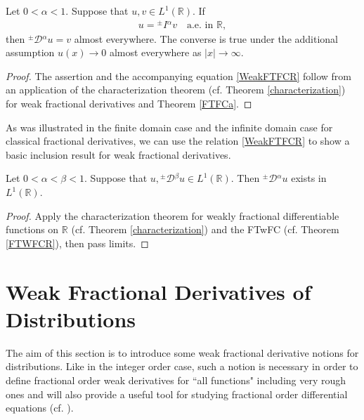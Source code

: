 \documentclass[leqno,final]{siamltex}
\numberwithin{equation}{section}
\renewcommand{\(}{\bigl(}
\renewcommand{\)}{\bigr)}
\newcommand{\R}{\mathbb{R}}
\begin{document}
\begin{theorem}\label{FTWFCR}
    Let $0 < \alpha < 1$. Suppose that $u, v \in L^{1}(\R)$. If
    \begin{align}\label{WeakFTFCR}
        u = {^{\pm}}{I}{^{\alpha}} v \quad \mbox{a.e. in } \R,
    \end{align}
    then ${^{\pm}}{\mathcal{D}}{^{\alpha}}u = v$ almost everywhere. The converse is true under the additional assumption $u(x) \rightarrow 0$ almost everywhere as $|x| \to \infty$.
\end{theorem}

\begin{proof}
    The assertion and the accompanying equation \eqref{WeakFTFCR} follow from
    an application of the characterization theorem (cf. Theorem \ref{characterization})
    for weak fractional derivatives and Theorem \ref{FTFCa}.
\end{proof}

As was illustrated in the finite domain case and the infinite domain case for classical fractional derivatives, we can use the relation \eqref{WeakFTFCR}
 to show a basic inclusion result for weak fractional derivatives.

\begin{proposition}
    Let $0 < \alpha < \beta < 1$. Suppose that $u, {^{\pm}}{\mathcal{D}}{^{\beta}} u \in L^{1}(\R)$. Then ${^{\pm}}{\mathcal{D}}{^{\alpha}}u$ exists in $L^{1}(\R)$. 
\end{proposition}

\begin{proof}
    Apply the characterization theorem for weakly fractional differentiable functions on $\R$ (cf. Theorem \ref{characterization}) and the FTwFC (cf. Theorem \ref{FTWFCR}), then pass limits.
\end{proof}



\section{Weak Fractional Derivatives of Distributions} \label{sec-6}
The aim of this section is to introduce some weak fractional derivative notions for distributions. 
Like in the integer order case, such a notion  is necessary in order to define fractional order 
weak derivatives for ``all functions" including very rough ones and will also provide a useful tool 
for studying  fractional order differential equations (cf. \cite{Feng_Sutton2, Guo, Meerschaert}).   
\end{document}
